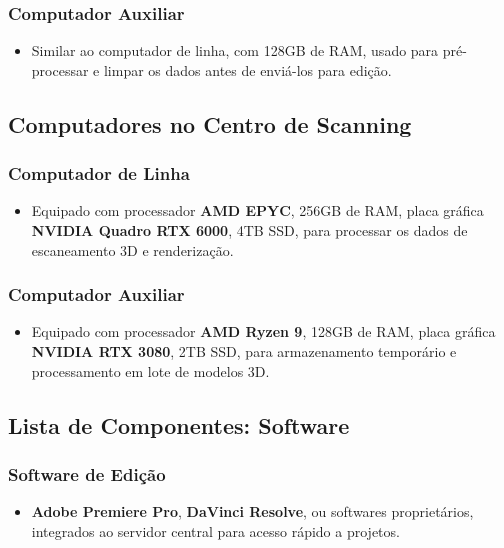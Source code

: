 \subsubsection{Computador Auxiliar}
\begin{itemize}
    \item Similar ao computador de linha, com 128GB de RAM, usado para pré-processar e limpar os dados antes de enviá-los para edição.
\end{itemize}

\subsection{Computadores no Centro de Scanning}

\subsubsection{Computador de Linha}
\begin{itemize}
    \item Equipado com processador \textbf{AMD EPYC}, 256GB de RAM, placa gráfica \textbf{NVIDIA Quadro RTX 6000}, 4TB SSD, para processar os dados de escaneamento 3D e renderização.
\end{itemize}

\subsubsection{Computador Auxiliar}
\begin{itemize}
    \item Equipado com processador \textbf{AMD Ryzen 9}, 128GB de RAM, placa gráfica \textbf{NVIDIA RTX 3080}, 2TB SSD, para armazenamento temporário e processamento em lote de modelos 3D.
\end{itemize}

\subsection{Lista de Componentes: Software}

\subsubsection{Software de Edição}
\begin{itemize}
    \item \textbf{Adobe Premiere Pro}, \textbf{DaVinci Resolve}, ou softwares proprietários, integrados ao servidor central para acesso rápido a projetos.
\end{itemize}

